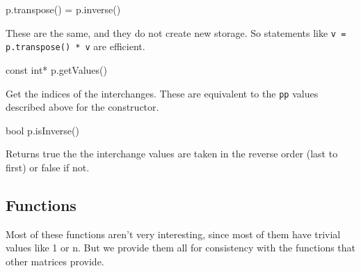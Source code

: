 \documentclass[twoside,letterpaper,11pt]{article}
\renewcommand{\tt}[1]{{\lstinline {#1}}}
\begin{document}
\begin{tmvcode}
p.transpose() = p.inverse()
\end{tmvcode}
These are the same, and they do not create new storage.  So statements like
\tt{v = p.transpose() * v} are efficient.

\begin{tmvcode}
const int* p.getValues()
\end{tmvcode}
Get the indices of the interchanges.  These are equivalent to the \tt{pp} values
described above for the constructor.

\begin{tmvcode}
bool p.isInverse()
\end{tmvcode}
Returns true the the interchange values are taken in the reverse order (last to first)
or false if not.
\vspace{12pt}

\subsection{Functions}
\label{Permutation_Functions}

Most of these functions aren't very interesting, since most of them have 
trivial values like 1 or n.  But we provide them all for consistency with the 
functions that other matrices provide.
\end{document}
